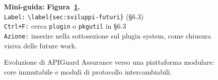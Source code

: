 \begin{figure}[ht]
{\begin{tikzpicture}
    \end{tikzpicture}
  }%
  \caption{Evoluzione di APIGuard Assurance verso una piattaforma modulare: core immutabile e moduli di protocollo intercambiabili.}
  \label{fig:modular-platform}
  \par\smallskip
  {\small \noindent\textbf{Mini-guida: Figura~\ref{fig:modular-platform}.}\\
    \texttt{Label:} \verb|\label{sec:sviluppi-futuri}| (\S6.3)\\
    \texttt{Ctrl+F:} cerca \texttt{plugin} o \texttt{pkgutil} in \S6.3\\
    \texttt{Azione:} inserire nella sottosezione sul plugin system, come chiusura visiva delle future work. }
\end{figure}


%
%
